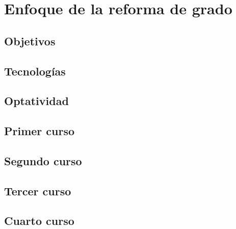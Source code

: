 \chapter{Enfoque de la reforma de grado}

\section{Objetivos}

\section{Tecnologías}


\section{Optatividad}

\section{Primer curso}


\section{Segundo curso}

\section{Tercer curso}

\section{Cuarto curso}

